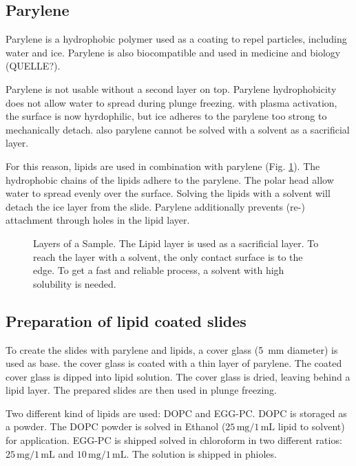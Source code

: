 \subsection{Parylene}

Parylene is a hydrophobic polymer used as a coating to repel particles, including water and ice. Parylene is also biocompatible and used in medicine and biology (QUELLE?).

Parylene is not usable without a second layer on top. Parylene hydrophobicity does not allow water to spread during plunge freezing. with plasma activation, the surface is now hyrdophilic, but ice adheres to the parylene too strong to mechanically detach. also parylene cannot be solved with a solvent as a sacrificial layer.

For this reason, lipids are used in combination with parylene (Fig. \ref{fig:sacrificial layer}). The hydrophobic chains of the lipids adhere to the parylene. The polar head allow water to spread evenly over the surface. Solving the lipids with a solvent will detach the ice layer from the slide. Parylene additionally prevents (re-) attachment through holes in the lipid layer. 

\begin{figure}[hbt!]
	\centering
	
	\caption{Layers of a Sample. The Lipid layer is used as a sacrificial layer. To reach the layer with a solvent, the only contact surface is to the edge. To get a fast and reliable process, a solvent with high solubility is needed.}
	\label{fig:sacrificial layer}
\end{figure}


\subsection{Preparation of lipid coated slides}

To create the slides with parylene and lipids, a cover glass (\SI{5}{\milli\meter} diameter) is used as base. the cover glass is coated with a thin layer of parylene. The coated cover glass is dipped into lipid solution. The cover glass is dried, leaving behind a lipid layer. The prepared slides are then used in plunge freezing.

Two different kind of lipids are used: DOPC and EGG-PC. DOPC is storaged as a powder. The DOPC powder is solved in Ethanol ($25\,\si{\milli\gram}/1\,\si{\milli\liter}$ lipid to solvent) for application. 
EGG-PC is shipped solved in chloroform in two different ratios: $25\,\si{\milli\gram}/1\,\si{\milli\liter}$ and $10\,\si{\milli\gram}/1\,\si{\milli\liter}$. The solution is shipped in phioles.

